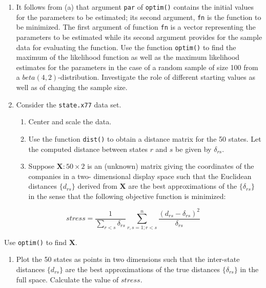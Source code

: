 \documentclass[
]{book}
\providecommand{\tightlist}{%
  \setlength{\itemsep}{0pt}\setlength{\parskip}{0pt}}
\begin{document}
\begin{enumerate}
\def\labelenumi{(\alph{enumi})}
\setcounter{enumi}{1}
\item
  It follows from (a) that argument \texttt{par} of \texttt{optim()} contains the initial values for the parameters to be estimated; its second argument, \texttt{fn} is the function to be minimized. The first argument of function \texttt{fn} is a vector representing the parameters to be estimated while its second argument provides for the sample data for evaluating the function. Use the function \texttt{optim()} to find the maximum of the likelihood function as well as the maximum likelihood estimates for the parameters in the case of a random sample of size 100 from a \(beta(4,2)\)-distribution. Investigate the role of different starting values as well as of changing the sample size.
\item
  Consider the \texttt{state.x77} data set.

  \begin{enumerate}
  \def\labelenumii{(\roman{enumii})}
  \item
    Center and scale the data.
  \item
    Use the function \texttt{dist()} to obtain a distance matrix for the 50 states. Let the computed distance between states \(r\) and \(s\) be given by \(\delta_{rs}\).
  \item
    Suppose \(\mathbf{X}: 50 \times 2\) is an (unknown) matrix giving the coordinates of the companies in a two- dimensional display space such that the Euclidean distances \(\{d_{rs} \}\) derived from \(\mathbf{X}\) are the best approximations of the \(\{\delta_{rs} \}\) in the sense that the following objective function is minimized:
  \end{enumerate}
\end{enumerate}

\[
stress = \frac{1}{\sum_{r<s}{\delta_{rs}}} \sum_{r,s=1;r<s}^{n}{\frac{(d_{rs}-\delta_{rs})^2}{\delta_{rs}}}
\]

Use \texttt{optim()} to find \(\mathbf{X}\).

\begin{enumerate}
\def\labelenumi{(\alph{enumi})}
\setcounter{enumi}{21}
\tightlist
\item
  Plot the 50 states as points in two dimensions such that the inter-state distances \(\{d_{rs} \}\) are the best approximations of the true distances \(\{\delta_{rs} \}\) in the full space. Calculate the value of \(stress\).
\end{enumerate}
\end{document}

